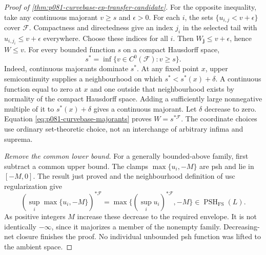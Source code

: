 \begin{proof}[Proof of \cref{thm:p081-curvebase-ep-transfer-candidate}]
For the opposite inequality, take any continuous majorant \(v\geq s\)
and \(\epsilon>0\). For each \(i\), the sets
\(\{u_{i,j}<v+\epsilon\}\) cover \(\mathcal F\). Compactness and
directedness give an index \(j_i\) in the selected tail with
\(u_{i,j_i}\leq v+\epsilon\) everywhere. Choose these indices for
all \(i\). Then \(W_{\boldsymbol j}\leq v+\epsilon\), hence \(W\leq v\).
For every bounded function \(s\) on a compact Hausdorff space,
\begin{equation}\label{eq:p081-curvebase-majorants}
       s^*=\inf\{v\in C^0(\mathcal F):v\geq s\}.
\end{equation}
Indeed, continuous majorants dominate \(s^*\). At any fixed point \(x\),
upper semicontinuity supplies a neighbourhood on which
\(s^*<s^*(x)+\delta\). A continuous function equal to zero at \(x\)
and one outside that neighbourhood exists by normality of the compact
Hausdorff space. Adding a sufficiently large nonnegative multiple of
it to \(s^*(x)+\delta\) gives a continuous majorant. Let \(\delta\)
decrease to zero. Equation \eqref{eq:p081-curvebase-majorants} proves
\(W=s^{*\mathcal F}\). The coordinate choices use ordinary
set-theoretic choice, not an interchange of arbitrary infima and suprema.

\emph{Remove the common lower bound.}
For a generally bounded-above family, first subtract a common upper
bound. The clamps \(\max\{u_i,-M\}\) are psh and lie in \([-M,0]\).
The result just proved and the neighbourhood definition of usc
regularization give
\[
 (\sup_i\max\{u_i,-M\})^{*\mathcal F}
          =\max\{(\sup_i u_i)^{*\mathcal F},-M\}
            \in\operatorname{PSH}_{\mathrm{FS}}(L).
\]
As positive integers \(M\) increase these decrease to the required
envelope. It is not identically \(-\infty\), since it majorizes a member
of the nonempty family. Decreasing-net closure finishes the proof.
No individual unbounded psh function was lifted to the ambient space.
\end{proof}

